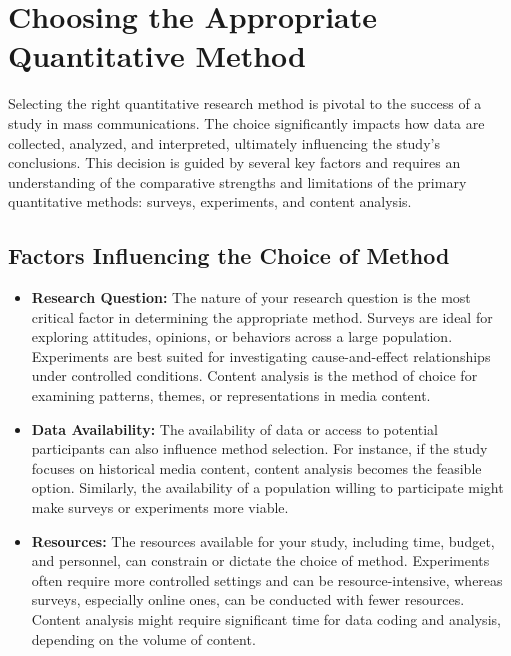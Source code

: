 \documentclass[
]{book}
\begin{document}
\hypertarget{choosing-the-appropriate-quantitative-method}{%
\section{Choosing the Appropriate Quantitative Method}\label{choosing-the-appropriate-quantitative-method}}

Selecting the right quantitative research method is pivotal to the success of a study in mass communications. The choice significantly impacts how data are collected, analyzed, and interpreted, ultimately influencing the study's conclusions. This decision is guided by several key factors and requires an understanding of the comparative strengths and limitations of the primary quantitative methods: surveys, experiments, and content analysis.

\hypertarget{factors-influencing-the-choice-of-method}{%
\subsection*{Factors Influencing the Choice of Method}\label{factors-influencing-the-choice-of-method}}

\begin{itemize}
\item
  \textbf{Research Question:} The nature of your research question is the most critical factor in determining the appropriate method. Surveys are ideal for exploring attitudes, opinions, or behaviors across a large population. Experiments are best suited for investigating cause-and-effect relationships under controlled conditions. Content analysis is the method of choice for examining patterns, themes, or representations in media content.
\item
  \textbf{Data Availability:} The availability of data or access to potential participants can also influence method selection. For instance, if the study focuses on historical media content, content analysis becomes the feasible option. Similarly, the availability of a population willing to participate might make surveys or experiments more viable.
\item
  \textbf{Resources:} The resources available for your study, including time, budget, and personnel, can constrain or dictate the choice of method. Experiments often require more controlled settings and can be resource-intensive, whereas surveys, especially online ones, can be conducted with fewer resources. Content analysis might require significant time for data coding and analysis, depending on the volume of content.
\end{itemize}
\end{document}
